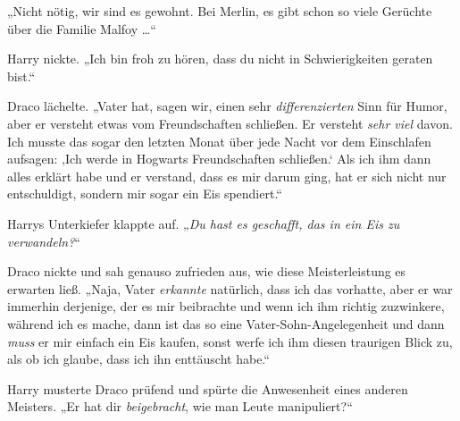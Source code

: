 „Nicht nötig, wir sind es gewohnt. Bei Merlin, es gibt schon so viele Gerüchte über die Familie Malfoy …“

Harry nickte.
„Ich bin froh zu hören, dass du nicht in Schwierigkeiten geraten bist.“

Draco lächelte.
„Vater hat, sagen wir, einen sehr \emph{differenzierten} Sinn für Humor, aber er versteht etwas vom Freundschaften schließen. Er versteht \emph{sehr viel} davon. Ich musste das sogar den letzten Monat über jede Nacht vor dem Einschlafen aufsagen: ‚Ich werde in Hogwarts Freundschaften schließen.‘ Als ich ihm dann alles erklärt habe und er verstand, dass es mir darum ging, hat er sich nicht nur entschuldigt, sondern mir sogar ein Eis spendiert.“

Harrys Unterkiefer klappte auf.
„\emph{Du hast es geschafft, \emph{das} in ein Eis zu verwandeln?}“

Draco nickte und sah genauso zufrieden aus, wie diese Meisterleistung es erwarten ließ.
„Naja, Vater \emph{erkannte} natürlich, dass ich das vorhatte, aber er war immerhin derjenige, der es mir beibrachte und wenn ich ihm richtig zuzwinkere, während ich es mache, dann ist das so eine Vater-Sohn-Angelegenheit und dann \emph{muss} er mir einfach ein Eis kaufen, sonst werfe ich ihm diesen traurigen Blick zu, als ob ich glaube, dass ich ihn enttäuscht habe.“

Harry musterte Draco prüfend und spürte die Anwesenheit eines anderen Meisters.
„Er hat dir \emph{beigebracht}, wie man Leute manipuliert?“

